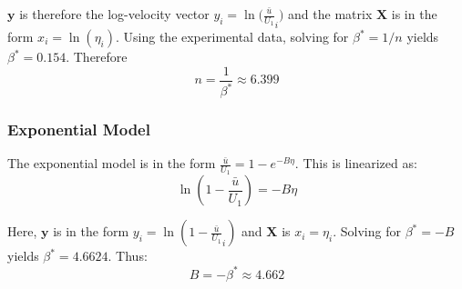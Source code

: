 \documentclass{article}
\begin{document}
$\mathbf{y}$ is therefore the log-velocity vector $y_i = \ln\bigg( \frac{\bar{u}}{U_1}_i\bigg)$ and the matrix $\mathbf{X}$ is in the form $x_i = \ln(\eta_i)$. Using the experimental data, solving for $\beta^*=1/n$ yields $\beta^*=0.154$. Therefore
\begin{equation*}
    n=\frac{1}{\beta^*}\approx 6.399
\end{equation*}

\subsubsection{Exponential Model}

The exponential model is in the form $\frac{\bar{u}}{U_1} = 1-e^{-B\eta}$. This is linearized as:
\begin{equation*}
    \ln\left(1 - \frac{\bar{u}}{U_1}\right) = -B\eta
\end{equation*}

Here, $\mathbf{y}$ is in the form $y_i = \ln\left(1 - \frac{\bar{u}}{U_1}_i\right)$ and $\mathbf{X}$ is $x_i = \eta_i$. Solving for $\beta^*=-B$ yields $\beta^*=4.6624$. Thus:
\begin{equation*}
    B = -\beta^* \approx 4.662
\end{equation*}
\end{document}
